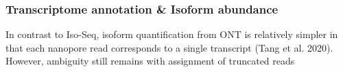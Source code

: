 
\subsubsection{Transcriptome annotation \& Isoform abundance } 
In contrast to Iso-Seq, isoform quantification from ONT is relatively simpler in that each nanopore read corresponds to a single transcript (Tang et al. 2020). However, ambiguity still remains with assignment of truncated reads 

